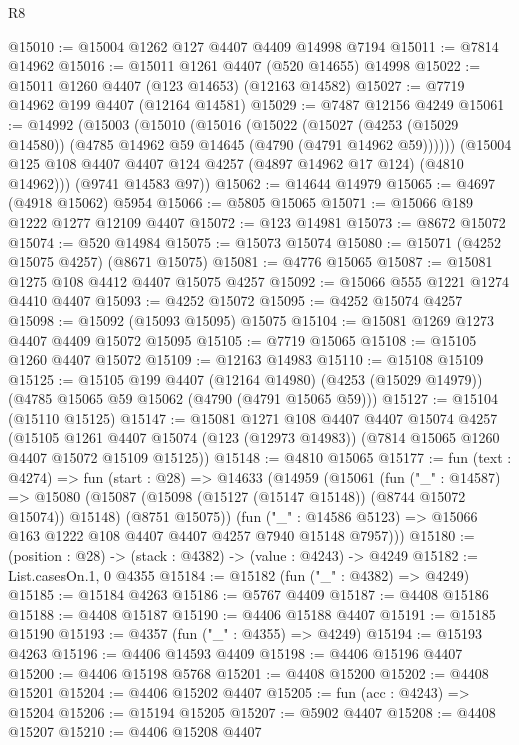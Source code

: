 \begin{lexlean}{R8}
\begin{coremodule}
@15010 := @15004 @1262 @127 @4407 @4409 @14998 @7194
@15011 := @7814 @14962
@15016 := @15011 @1261 @4407 (@520 @14655) @14998
@15022 := @15011 @1260 @4407 (@123 @14653) (@12163 @14582)
@15027 := @7719 @14962 @199 @4407 (@12164 @14581)
@15029 := @7487 @12156 @4249
@15061 := @14992
    (@15003
      (@15010
        (@15016
          (@15022
            (@15027 (@4253 (@15029 @14580)) (@4785 @14962 @59 @14645 (@4790 (@4791 @14962 @59))))))
        (@15004 @125 @108 @4407 @4407 @124 @4257 (@4897 @14962 @17 @124) (@4810 @14962)))
      (@9741 @14583 @97))
@15062 := @14644 @14979
@15065 := @4697 (@4918 @15062) @5954
@15066 := @5805 @15065
@15071 := @15066 @189 @1222 @1277 @12109 @4407
@15072 := @123 @14981
@15073 := @8672 @15072
@15074 := @520 @14984
@15075 := @15073 @15074
@15080 := @15071 (@4252 @15075 @4257) (@8671 @15075)
@15081 := @4776 @15065
@15087 := @15081 @1275 @108 @4412 @4407 @15075 @4257
@15092 := @15066 @555 @1221 @1274 @4410 @4407
@15093 := @4252 @15072
@15095 := @4252 @15074 @4257
@15098 := @15092 (@15093 @15095) @15075
@15104 := @15081 @1269 @1273 @4407 @4409 @15072 @15095
@15105 := @7719 @15065
@15108 := @15105 @1260 @4407 @15072
@15109 := @12163 @14983
@15110 := @15108 @15109
@15125 := @15105
    @199
    @4407
    (@12164 @14980)
    (@4253 (@15029 @14979))
    (@4785 @15065 @59 @15062 (@4790 (@4791 @15065 @59)))
@15127 := @15104 (@15110 @15125)
@15147 := @15081
    @1271
    @108
    @4407
    @4407
    @15074
    @4257
    (@15105
      @1261
      @4407
      @15074
      (@123 (@12973 @14983))
      (@7814 @15065 @1260 @4407 @15072 @15109 @15125))
@15148 := @4810 @15065
@15177 := fun (text : @4274) =>
  fun (start : @28) =>
  @14633
    (@14959
      (@15061
        (fun ("_" : @14587) =>
        @15080
          (@15087 (@15098 (@15127 (@15147 @15148)) (@8744 @15072 @15074)) @15148)
          (@8751 @15075))
        (fun ("_" : @14586 @5123) => @15066 @163 @1222 @108 @4407 @4407 @4257 @7940 @15148 @7957)))
@15180 := (position : @28) -> (stack : @4382) -> (value : @4243) -> @4249
@15182 := List.casesOn.{1, 0} @4355
@15184 := @15182 (fun ("_" : @4382) => @4249)
@15185 := @15184 @4263
@15186 := @5767 @4409
@15187 := @4408 @15186
@15188 := @4408 @15187
@15190 := @4406 @15188 @4407
@15191 := @15185 @15190
@15193 := @4357 (fun ("_" : @4355) => @4249)
@15194 := @15193 @4263
@15196 := @4406 @14593 @4409
@15198 := @4406 @15196 @4407
@15200 := @4406 @15198 @5768
@15201 := @4408 @15200
@15202 := @4408 @15201
@15204 := @4406 @15202 @4407
@15205 := fun (acc : @4243) => @15204
@15206 := @15194 @15205
@15207 := @5902 @4407
@15208 := @4408 @15207
@15210 := @4406 @15208 @4407

\end{coremodule}
\end{lexlean}
